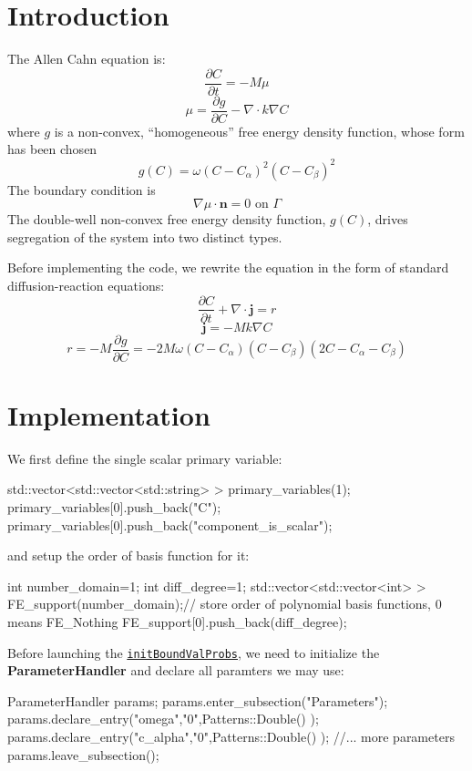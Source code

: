 \hypertarget{growth_Introduction}{}\section{Introduction}\label{growth_Introduction}
The Allen Cahn equation is\-: \[ \frac{\partial C}{\partial t}=-M\mu \] \[ \mu=\frac{\partial g}{\partial C}-\nabla\cdot k\nabla C \] where $g$ is a non-\/convex, ``homogeneous'' free energy density function, whose form has been chosen \[ g(C)=\omega(C-C_\alpha)^2(C-C_\beta)^2 \] The boundary condition is \[ \nabla \mu\cdot\boldsymbol{n}=0 \text{ on }\Gamma \] The double-\/well non-\/convex free energy density function, $g(C)$, drives segregation of the system into two distinct types.

Before implementing the code, we rewrite the equation in the form of standard diffusion-\/reaction equations\-: \[ \frac{\partial C}{\partial t}+\nabla\cdot\boldsymbol{j}=r \] \[ \boldsymbol{j}=-Mk\nabla C \] \[ r=-M\frac{\partial g}{\partial C}=-2M\omega(C-C_\alpha)(C-C_\beta)(2C-C_\alpha-C_\beta) \]\hypertarget{growth_imple}{}\section{Implementation}\label{growth_imple}
We first define the single scalar primary variable\-: 
\begin{DoxyCode}
  std::vector<std::vector<std::string> > primary\_variables(1);        
primary\_variables[0].push\_back(\textcolor{stringliteral}{"C"}); primary\_variables[0].push\_back(\textcolor{stringliteral}{"component\_is\_scalar"});
\end{DoxyCode}
 and setup the order of basis function for it\-: 
\begin{DoxyCode}
\textcolor{keywordtype}{int} number\_domain=1;
\textcolor{keywordtype}{int} diff\_degree=1;
std::vector<std::vector<int> > FE\_support(number\_domain);\textcolor{comment}{// store order of polynomial basis functions, 0
       means FE\_Nothing   }
FE\_support[0].push\_back(diff\_degree);
\end{DoxyCode}
 Before launching the \href{../html/classinit_bound_val_probs.html}{\tt init\-Bound\-Val\-Probs}, we need to initialize the {\bfseries Parameter\-Handler} and declare all paramters we may use\-: 
\begin{DoxyCode}
ParameterHandler params;
params.enter\_subsection(\textcolor{stringliteral}{"Parameters"});  
params.declare\_entry(\textcolor{stringliteral}{"omega"},\textcolor{stringliteral}{"0"},Patterns::Double() );
params.declare\_entry(\textcolor{stringliteral}{"c\_alpha"},\textcolor{stringliteral}{"0"},Patterns::Double() );
\textcolor{comment}{//... more parameters }
params.leave\_subsection();  
\end{DoxyCode}
